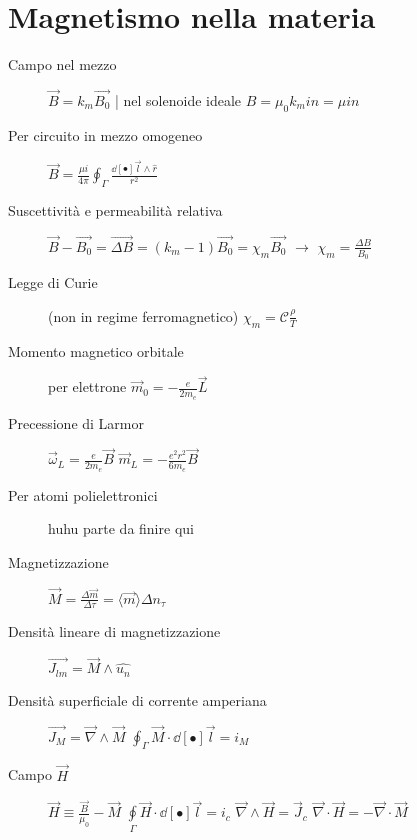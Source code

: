 \documentclass[10pt, oneside]{article}
\begin{document}
\section{Magnetismo nella materia}

\begin{description}

\item[Campo nel mezzo] \hfill $\displaystyle \vec{B} = k_m \vec{B_0}$ \quad | \quad nel solenoide ideale \quad $B = \mu_0 k_m i n = \mu i n$

\item[Per circuito in mezzo omogeneo] \hfill $\displaystyle \vec{B} = \frac{\mu i}{4 \pi} \oint_\Gamma \frac{\dd[•]{\vec{l}} \wedge \hat{r}}{r^2}$

\item[Suscettività e permeabilità relativa] \hfill $\vec{B} - \vec{B_0} = \vec{\Delta B} = (k_m - 1) \vec{B_0} = \chi_m \vec{B_0}$ $\longrightarrow$ $\displaystyle \chi_m = \frac{\Delta B}{B_0}$

\item[Legge di Curie] (non in regime ferromagnetico) \hfill $\chi_m = \mathcal{C} \frac{\rho}{T}$

\item[Momento magnetico orbitale] per elettrone \hfill $\displaystyle \vec{m}_0 = - \frac{e}{2 m_e} \vec{L}$

\item[Precessione di Larmor] \hfill $\displaystyle \vec{\omega}_L = \frac{e}{2 m_e} \vec{B}$ \qquad $\displaystyle \vec{m}_L = - \frac{e^2 r^2}{6 m_e} \vec{B}$

\item[Per atomi polielettronici] huhu parte da finire qui

\item[Magnetizzazione] \hfill $\displaystyle \vec{M} = \frac{\Delta \vec{m}}{\Delta \tau} = \langle \vec{m} \rangle \Delta n_\tau$

\item[Densità lineare di magnetizzazione] \hfill $\displaystyle \vec{J_{lm}} = \vec{M} \wedge \hat{u_n}$ 

\item[Densità superficiale di corrente amperiana] \hfill $\displaystyle \vec{J_M} = \vec{\nabla} \wedge \vec{M}$ \qquad $\displaystyle \oint_\Gamma \vec{M} \cdot \dd[•]{\vec{l}} = i_M$

\item[Campo $\vec{H}$] \hfill $\displaystyle \vec{H} \equiv \frac{\vec{B}}{\mu_0} - \vec{M}$ \qquad $\displaystyle \oint\limits_\Gamma \vec{H} \cdot \dd[•]{\vec{l}} = i_c$ \qquad $\displaystyle \vec{\nabla} \wedge \vec{H} = \vec{J}_c$ \quad $\displaystyle \vec{\nabla} \cdot \vec{H} = - \vec{\nabla} \cdot \vec{M}$


\end{description}
\end{document}
